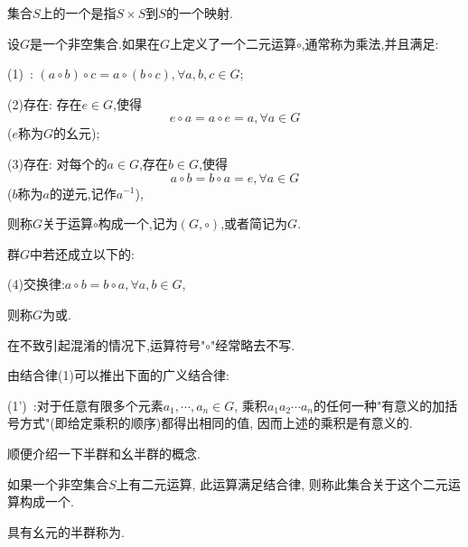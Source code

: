 集合$S$上的一个是指$S\times S$到$S$的一个映射.
\begin{definition}[群]
	设$G$是一个非空集合.如果在$G$上定义了一个二元运算$\circ$,通常称为乘法,并且满足:
	\begin{blist}
		\item (1)~: $(a\circ b)\circ c = a\circ (b\circ c), \forall a,b,c\in G$;
		\item (2)存在: 存在$e\in G$,使得\begin{equation}
			e\circ a = a\circ e = a, \forall a\in G
		\end{equation}($e$称为$G$的幺元);
		\item (3)存在: 对每个的$a\in G$,存在$b\in G$,使得\begin{equation}
			 a\circ b = b\circ a = e, \forall a\in G
		\end{equation}($b$称为$a$的逆元,记作$a^{-1}$),
	\end{blist}
	则称$G$关于运算$\circ$构成一个,记为$(G,\circ)$,或者简记为$G$.
	
	群$G$中若还成立以下的:
	\begin{blist}
		\item (4)交换律:$a\circ b = b\circ a,\forall a,b\in G$,
	\end{blist}
	则称$G$为或\myind{Abel 群}.
\end{definition}
在不致引起混淆的情况下,运算符号"$\circ$"经常略去不写.

由结合律(1)可以推出下面的广义结合律:
\begin{blist}
	\item (1')~:对于任意有限多个元素$a_1,\cdots,a_n\in G$, 乘积$a_1a_2\cdots a_n$的任何一种"有意义的加括号方式"(即给定乘积的顺序)都得出相同的值, 因而上述的乘积是有意义的.
\end{blist}

顺便介绍一下半群和幺半群的概念.
\begin{definition}[半群、幺半群]
	如果一个非空集合$S$上有二元运算, 此运算满足结合律, 则称此集合关于这个二元运算构成一个.
	
	具有幺元的半群称为.
\end{definition}

